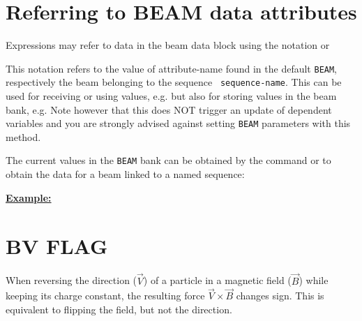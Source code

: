 \section{Referring to BEAM data attributes}
 
Expressions may refer to data in the beam data block using the
notation  
or 

This notation refers to the value of attribute-name found in the default
{\tt BEAM}, respectively the beam belonging to the sequence {\tt 
sequence-name}. 
This can be used for receiving or using values, e.g. 
but also for storing values in the beam bank, e.g.  
Note however that this does NOT trigger an update of dependent variables
and you are strongly advised against setting {\tt BEAM} parameters with this 
method.

The current values in the {\tt BEAM} bank can be obtained by the command
or to obtain the data for a beam linked to a named sequence:


{\bf \underline{Example:}} 





\section{BV FLAG}
\label{sec:bvflag}
When reversing the direction ($\vec V$) of a particle in a magnetic field
($\vec B$) while keeping its charge constant, the resulting force $\vec
V \times \vec B$ changes sign. This is equivalent to flipping the field,
but not the direction.  

